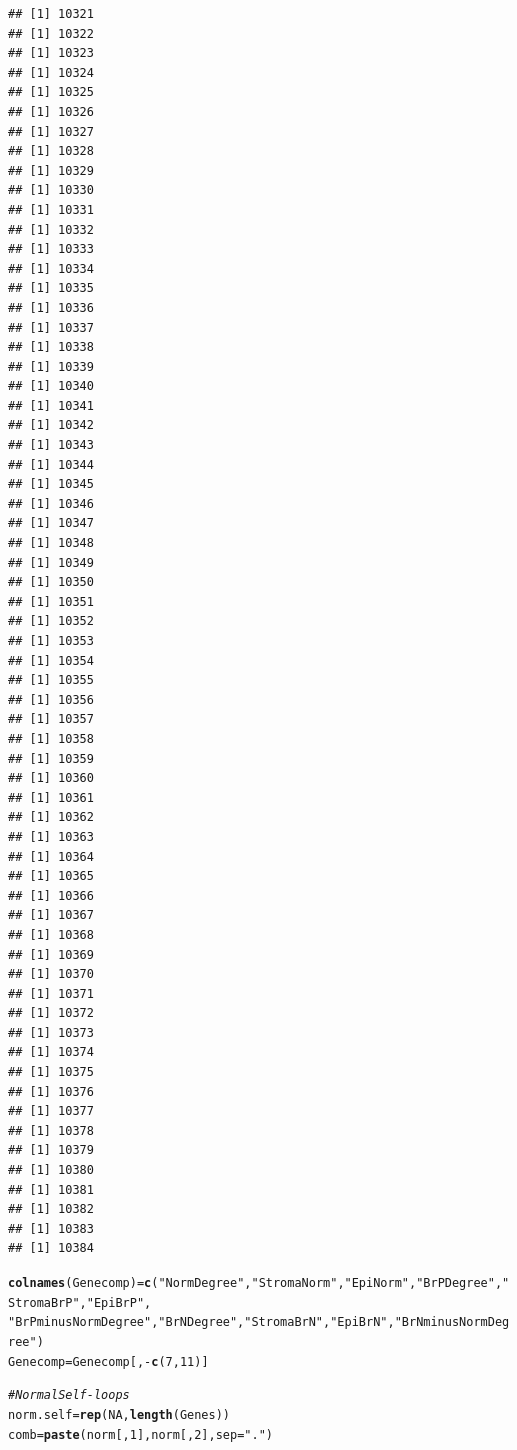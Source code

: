 \documentclass{article}\usepackage[]{graphicx}\usepackage[]{color}
\makeatletter
\newcommand{\hlnum}[1]{\textcolor[rgb]{0.686,0.059,0.569}{#1}}%
\newcommand{\hlstr}[1]{\textcolor[rgb]{0.192,0.494,0.8}{#1}}%
\newcommand{\hlcom}[1]{\textcolor[rgb]{0.678,0.584,0.686}{\textit{#1}}}%
\newcommand{\hlopt}[1]{\textcolor[rgb]{0,0,0}{#1}}%
\newcommand{\hlstd}[1]{\textcolor[rgb]{0.345,0.345,0.345}{#1}}%
\newcommand{\hlkwb}[1]{\textcolor[rgb]{0.69,0.353,0.396}{#1}}%
\newcommand{\hlkwc}[1]{\textcolor[rgb]{0.333,0.667,0.333}{#1}}%
\newcommand{\hlkwd}[1]{\textcolor[rgb]{0.737,0.353,0.396}{\textbf{#1}}}%
\newenvironment{kframe}{%
 \def\at@end@of@kframe{}%
 \ifinner\ifhmode%
  \def\at@end@of@kframe{\end{minipage}}%
  \begin{minipage}{\columnwidth}%
 \fi\fi%
 \def\FrameCommand##1{\hskip\@totalleftmargin \hskip-\fboxsep
 \colorbox{shadecolor}{##1}\hskip-\fboxsep
     \hskip-\linewidth \hskip-\@totalleftmargin \hskip\columnwidth}%
 \MakeFramed {\advance\hsize-\width
   \@totalleftmargin\z@ \linewidth\hsize
   \@setminipage}}%
 {\par\unskip\endMakeFramed%
 \at@end@of@kframe}
\newenvironment{knitrout}{}{} %
\makeatother
\begin{document}
\begin{knitrout}
\begin{kframe}
\begin{verbatim}
## [1] 10321
## [1] 10322
## [1] 10323
## [1] 10324
## [1] 10325
## [1] 10326
## [1] 10327
## [1] 10328
## [1] 10329
## [1] 10330
## [1] 10331
## [1] 10332
## [1] 10333
## [1] 10334
## [1] 10335
## [1] 10336
## [1] 10337
## [1] 10338
## [1] 10339
## [1] 10340
## [1] 10341
## [1] 10342
## [1] 10343
## [1] 10344
## [1] 10345
## [1] 10346
## [1] 10347
## [1] 10348
## [1] 10349
## [1] 10350
## [1] 10351
## [1] 10352
## [1] 10353
## [1] 10354
## [1] 10355
## [1] 10356
## [1] 10357
## [1] 10358
## [1] 10359
## [1] 10360
## [1] 10361
## [1] 10362
## [1] 10363
## [1] 10364
## [1] 10365
## [1] 10366
## [1] 10367
## [1] 10368
## [1] 10369
## [1] 10370
## [1] 10371
## [1] 10372
## [1] 10373
## [1] 10374
## [1] 10375
## [1] 10376
## [1] 10377
## [1] 10378
## [1] 10379
## [1] 10380
## [1] 10381
## [1] 10382
## [1] 10383
## [1] 10384
\end{verbatim}
\begin{alltt}
\hlkwd{colnames}\hlstd{(Genecomp)}\hlkwb{=}\hlkwd{c}\hlstd{(}\hlstr{"NormDegree"}\hlstd{,}\hlstr{"StromaNorm"}\hlstd{,}\hlstr{"EpiNorm"}\hlstd{,}\hlstr{"BrPDegree"}\hlstd{,}\hlstr{"StromaBrP"}\hlstd{,}\hlstr{"EpiBrP"}\hlstd{,}
               \hlstr{"BrPminusNormDegree"}\hlstd{,}\hlstr{"BrNDegree"}\hlstd{,}\hlstr{"StromaBrN"}\hlstd{,}\hlstr{"EpiBrN"}\hlstd{,}\hlstr{"BrNminusNormDegree"}\hlstd{)}
\hlstd{Genecomp}\hlkwb{=}\hlstd{Genecomp[,}\hlopt{-}\hlkwd{c}\hlstd{(}\hlnum{7}\hlstd{,}\hlnum{11}\hlstd{)]}

\hlcom{# Normal Self-loops}
\hlstd{norm.self}\hlkwb{=}\hlkwd{rep}\hlstd{(}\hlnum{NA}\hlstd{,}\hlkwd{length}\hlstd{(Genes))}
\hlstd{comb}\hlkwb{=}\hlkwd{paste}\hlstd{(norm[,}\hlnum{1}\hlstd{],norm[,}\hlnum{2}\hlstd{],}\hlkwc{sep}\hlstd{=}\hlstr{"."}\hlstd{)}


\end{alltt}
\end{kframe}
\end{knitrout}
\end{document}
